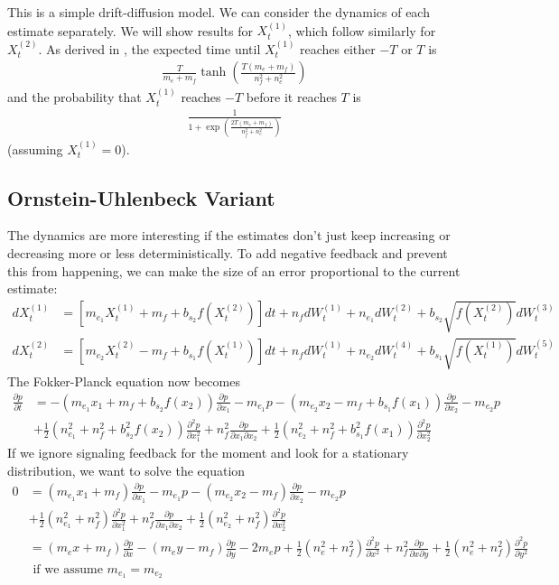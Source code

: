 \documentclass{article}
\begin{document}
This is a simple drift-diffusion model.  We can consider the dynamics of each estimate separately.  We will show results for $X_t^{(1)}$, which follow similarly for $X_t^{(2)}$.  As derived in \cite{Bogacz:2006uq}, the expected time until $X_t^{(1)}$ reaches either $-T$ or $T$ is 
\begin{align*}
\frac{T}{m_e+m_f}\tanh\left(\frac{T(m_e+m_f)}{n_f^2+n_e^2}\right)
\end{align*}
and the probability that $X_t^{(1)}$ reaches $-T$ before it reaches $T$ is
\begin{align*}
\frac{1}{1+\exp\left(\frac{2T(m_e+m_f)}{n_f^2+n_e^2}\right)}
\end{align*}
(assuming $X_t^{(1)}=0$).

\subsection{Ornstein-Uhlenbeck Variant }
The dynamics are more interesting if the estimates don't just keep increasing or decreasing more or less deterministically.  To add negative feedback and prevent this from happening, we can make the size of an error proportional to the current estimate:
\begin{align*}
dX_t^{(1)}&=\left[m_{e_1}X_t^{(1)}+m_f+b_{s_2}f(X_t^{(2)})\right]dt+n_fdW_t^{(1)}+n_{e_1}dW_t^{(2)}+b_{s_2}\sqrt{f(X_t^{(2)})}dW_t^{(3)}
\\ dX_t^{(2)}&=\left[m_{e_2}X_t^{(2)}-m_f+b_{s_1}f(X_t^{(1)})\right]dt+n_fdW_t^{(1)}+n_{e_2}dW_t^{(4)}+b_{s_1}\sqrt{f(X_t^{(1)})}dW_t^{(5)}
\end{align*}
The Fokker-Planck equation now becomes
\begin{align*}
 \frac{\partial p}{\partial t}&=-(m_{e_1}x_1+m_f+b_{s_2}f(x_2))\frac{\partial p}{\partial x_1}-m_{e_1}p-(m_{e_2}x_2-m_f+b_{s_1}f(x_1))\frac{\partial p}{\partial x_2}-m_{e_2}p
\\&+\frac{1}{2}(n_{e_1}^2+n_f^2+b_{s_2}^2f(x_2))\frac{\partial^2 p}{\partial x_1^2}+n_f^2\frac{\partial p}{\partial x_1\partial x_2}+\frac{1}{2}(n_{e_2}^2+n_f^2+b_{s_1}^2f(x_1))\frac{\partial^2 p}{\partial x_2^2}
\end{align*}
If we ignore signaling feedback for the moment and look for a stationary distribution, we want to solve the equation
\begin{align*}
0&=(m_{e_1}x_1+m_f)\frac{\partial p}{\partial x_1}-m_{e_1}p-(m_{e_2}x_2-m_f)\frac{\partial p}{\partial x_2}-m_{e_2}p
\\&+\frac{1}{2}(n_{e_1}^2+n_f^2)\frac{\partial^2 p}{\partial x_1^2}+n_f^2\frac{\partial p}{\partial x_1\partial x_2}+\frac{1}{2}(n_{e_2}^2+n_f^2)\frac{\partial^2 p}{\partial x_2^2}
\\&=(m_ex+m_f)\frac{\partial p}{\partial x}-(m_ey-m_f)\frac{\partial p}{\partial y}-2m_ep+\frac{1}{2}(n_e^2+n_f^2)\frac{\partial^2 p}{\partial x^2}+n_f^2\frac{\partial p}{\partial x\partial y}+\frac{1}{2}(n_e^2+n_f^2)\frac{\partial^2 p}{\partial y^2}
\\& \text{ if we assume $m_{e_1}=m_{e_2}$}
\end{align*}
\end{document}
